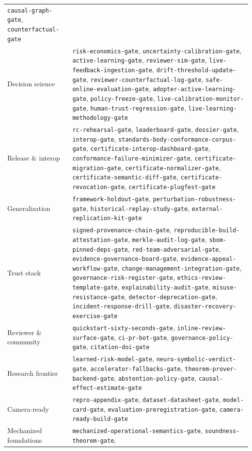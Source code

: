 \documentclass[11pt]{article}
\newcommand{\code}[1]{\texttt{#1}}
\begin{document}
\begin{longtable}{>{\raggedright\arraybackslash}p{3.4cm}>{\raggedright\arraybackslash}p{10.6cm}}
\code{causal-graph-gate}, \code{counterfactual-gate} \\
Decision science & \code{risk-economics-gate}, \code{uncertainty-calibration-gate},
\code{active-learning-gate}, \code{reviewer-sim-gate}, \code{live-feedback-ingestion-gate},
\code{drift-threshold-update-gate}, \code{reviewer-counterfactual-log-gate},
\code{safe-online-evaluation-gate}, \code{adopter-active-learning-gate},
\code{policy-freeze-gate}, \code{live-calibration-monitor-gate},
\code{human-trust-regression-gate}, \code{live-learning-methodology-gate} \\
Release \& interop & \code{rc-rehearsal-gate}, \code{leaderboard-gate}, \code{dossier-gate},
\code{interop-gate}, \code{standards-body-conformance-corpus-gate},
\code{certificate-interop-dashboard-gate}, \code{conformance-failure-minimizer-gate},
\code{certificate-migration-gate}, \code{certificate-normalizer-gate},
\code{certificate-semantic-diff-gate}, \code{certificate-revocation-gate},
\code{certificate-plugfest-gate} \\
Generalization & \code{framework-holdout-gate}, \code{perturbation-robustness-gate},
\code{historical-replay-study-gate}, \code{external-replication-kit-gate} \\
Trust stack & \code{signed-provenance-chain-gate}, \code{reproducible-build-attestation-gate},
\code{merkle-audit-log-gate}, \code{sbom-pinned-deps-gate}, \code{red-team-adversarial-gate},
\code{evidence-governance-board-gate}, \code{evidence-appeal-workflow-gate},
\code{change-management-integration-gate}, \code{governance-risk-register-gate},
\code{ethics-review-template-gate}, \code{explainability-audit-gate}, \code{misuse-resistance-gate},
\code{detector-deprecation-gate}, \code{incident-response-drill-gate},
\code{disaster-recovery-exercise-gate} \\
Reviewer \& community & \code{quickstart-sixty-seconds-gate}, \code{inline-review-surface-gate},
\code{ci-pr-bot-gate}, \code{governance-policy-gate}, \code{citation-doi-gate} \\
Research frontier & \code{learned-risk-model-gate}, \code{neuro-symbolic-verdict-gate}, \code{accelerator-fallbacks-gate},
\code{theorem-prover-backend-gate}, \code{abstention-policy-gate}, \code{causal-effect-estimate-gate} \\
Camera-ready & \code{repro-appendix-gate}, \code{dataset-datasheet-gate}, \code{model-card-gate},
\code{evaluation-preregistration-gate}, \code{camera-ready-build-gate} \\
Mechanized foundations & \code{mechanized-operational-semantics-gate}, \code{soundness-theorem-gate},

\end{longtable}
\end{document}

